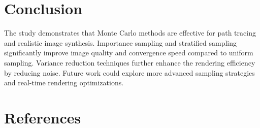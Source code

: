 \documentclass[12pt]{article}
\begin{document}
\section{Conclusion}
\label{sec:conclusion}
The study demonstrates that Monte Carlo methods are effective for path tracing and realistic image synthesis. Importance sampling and stratified sampling significantly improve image quality and convergence speed compared to uniform sampling. Variance reduction techniques further enhance the rendering efficiency by reducing noise. Future work could explore more advanced sampling strategies and real-time rendering optimizations.

\section{References}
\label{sec:references}


\end{document}
